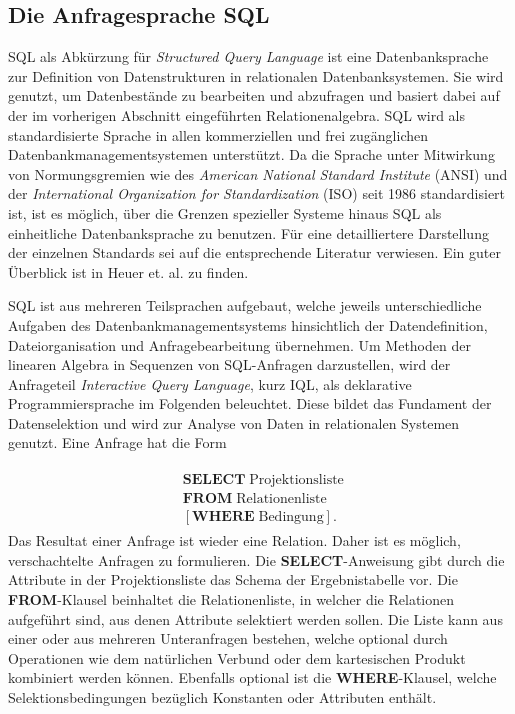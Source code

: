 \subsection{Die Anfragesprache SQL}
\label{abs:SQL_intro}
SQL als Abkürzung für \textit{Structured Query Language} ist eine Datenbanksprache zur Definition von Datenstrukturen in relationalen Datenbanksystemen. Sie wird genutzt, um Datenbestände zu bearbeiten und abzufragen und basiert dabei auf der im vorherigen Abschnitt eingeführten Relationenalgebra. SQL wird als standardisierte Sprache in allen kommerziellen und frei zugänglichen Datenbankmanagementsystemen unterstützt. Da die Sprache unter Mitwirkung von Normungsgremien wie des \textit{American National Standard Institute} (ANSI) und der \textit{International Organization for Standardization} (ISO) seit 1986 standardisiert ist, ist es möglich, über die Grenzen spezieller Systeme hinaus SQL als einheitliche Datenbanksprache zu benutzen. Für eine detailliertere Darstellung der einzelnen Standards sei auf die entsprechende Literatur verwiesen. Ein guter Überblick ist in Heuer et. al.\cite{DBLP:books/daglib/0044627} zu finden.

SQL ist aus mehreren Teilsprachen aufgebaut, welche jeweils unterschiedliche Aufgaben des Datenbankmanagementsystems hinsichtlich der Datendefinition, Dateiorganisation und Anfragebearbeitung übernehmen. Um Methoden der linearen Algebra in Sequenzen von SQL-Anfragen darzustellen, wird der Anfrageteil \textit{Interactive Query Language}, kurz IQL, als deklarative Programmiersprache im Folgenden beleuchtet. Diese bildet das Fundament der Datenselektion und wird zur Analyse von Daten in relationalen Systemen genutzt. Eine Anfrage hat die Form 

\begin{align}
    \label{anf:stand}
    \begin{split}
    & \mathbf{SELECT} \; \text{Projektionsliste }\\
    & \mathbf{FROM} \; \text{Relationenliste } \\
    & [\mathbf{WHERE} \; \text{Bedingung}].
\end{split}
\end{align}
Das Resultat einer Anfrage ist wieder eine Relation. Daher ist es möglich, verschachtelte Anfragen zu formulieren. Die \textbf{SELECT}-Anweisung gibt durch die Attribute in der Projektionsliste das Schema der Ergebnistabelle vor. Die \textbf{FROM}-Klausel beinhaltet die Relationenliste, in welcher die Relationen aufgeführt sind, aus denen Attribute selektiert werden sollen. Die Liste kann aus einer oder aus mehreren Unteranfragen bestehen, welche optional durch Operationen wie dem natürlichen Verbund oder dem kartesischen Produkt kombiniert werden können. Ebenfalls optional ist die \textbf{WHERE}-Klausel, welche Selektionsbedingungen bezüglich Konstanten oder Attributen enthält. 

